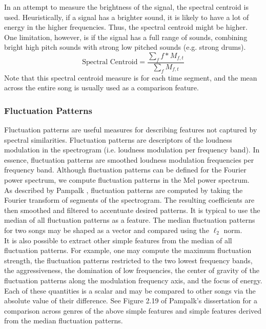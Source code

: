 \documentclass[12pt]{article}
\begin{document}
In an attempt to measure the brightness of the signal, the spectral centroid is used.  Heuristically, if a signal has a brighter sound, it is likely to have a lot of energy in the higher frequencies.  Thus, the spectral centroid might be higher.  One limitation, however, is if the signal has a full range of sounds, combining bright high pitch sounds with strong low pitched sounds (e.g. strong drums).
$$ \text{Spectral Centroid} = \frac{\sum_f f*M_{f,t}}{\sum_f M_{f,t}} $$
Note that this spectral centroid measure is for each time segment, and the mean across the entire song is usually used as a comparison feature.

\subsubsection{Fluctuation Patterns}

Fluctuation patterns are useful measures for describing features not captured by spectral similarities.  Fluctuation patterns are descriptors of the loudness modulation in the spectrogram (i.e. loudness modulation per frequency band).  In essence, fluctuation patterns are smoothed loudness modulation frequencies per frequency band.  Although fluctuation patterns can be defined for the Fourier power spectrum, we compute fluctuation patterns in the Mel power spectrum.\\

As described by Pampalk \cite{pampalk:dissertation}, fluctuation patterns are computed by taking the Fourier transform of segments of the spectrogram.  The resulting coefficients are then smoothed and filtered to accentuate desired patterns.  It is typical to use the median of all fluctuation patterns as a feature.  The median fluctuation patterns for two songs may be shaped as a vector and compared using the $\ell_2$ norm.\\

It is also possible to extract other simple features from the median of all fluctuation patterns.  For example, one may compute the maximum fluctuation strength, the fluctuation patterns restricted to the two lowest frequency bands, the aggressiveness, the domination of low frequencies, the center of gravity of the fluctuation patterns along the modulation frequency axis, and the focus of energy.  Each of these quantities is a scalar and may be compared to other songs via the absolute value of their difference.  See Figure 2.19 of Pampalk's dissertation \cite{pampalk:dissertation} for a comparison across genres of the above simple features and simple features derived from the median fluctuation patterns.\\
\end{document}
